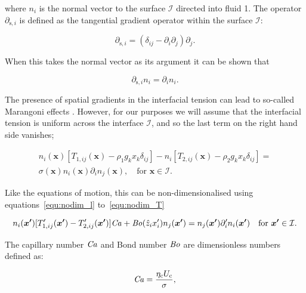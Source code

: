 \documentclass[12pt]{article}
\newcommand\Bo{\mbox{\textit{Bo}}}  %
\newcommand\Ca{\mbox{\textit{Ca}}} %
\begin{document}
where $n_{i}$ is the normal vector to the surface $\mathcal{I}$ directed into fluid 1. The operator $\partial_{\text{s},i}$ is defined as the tangential gradient operator within the surface $\mathcal{I}$:

\begin{equation}
\label{equ:surf_grad}
\partial_{\text{s},i} = (\delta_{ij} - \partial_{i} \partial_{j}) \partial_{j} .
\end{equation}

When this takes the normal vector as its argument it can be shown that \citep{Brackbill92}

\begin{equation}
\label{equ:tang_diff_norm}
\partial_{\text{s},i} n_{i} = \partial_{i} n_{i}.
\end{equation}

The presence of spatial gradients in the interfacial tension can lead to so-called Marangoni effects \citep{Thomson1855, Gibbs1878}. However, for our purposes we will assume that the interfacial tension is uniform across the interface $\mathcal{I}$, and so the last term on the right hand side vanishes;

\begin{align}
\label{equ:fluid_fluid_dyn_nograd}
n_{i}(\boldsymbol{x}) [{T}_{1,ij} (\boldsymbol{x}) - \rho_{1} g_{k} x_{k} \delta_{ij}] - n_{i} [T_{2,ij}(\boldsymbol{x}) - \rho_{2} g_{k} x_{k} \delta_{ij}] = \\ \nonumber
\sigma(\boldsymbol{x}) n_{i}(\boldsymbol{x}) \partial_{i} n_{j}(\boldsymbol{x}),  \quad \text{for }\boldsymbol{x} \in \mathcal{I}.
\end{align}

Like the equations of motion, this can be non-dimensionalised using equations~\ref{equ:nodim_l} to~\ref{equ:nodim_T}

\begin{equation}
\label{equ:nodim_fluid_fluid_dyn}
n_{i}(\boldsymbol{x'}) [T'_{1,ij}(\boldsymbol{x'}) - T'_{2,ij}(\boldsymbol{x'})] \Ca + \Bo (\hat{z}_{i} x'_{i}) n_{j}(\boldsymbol{x'}) = n_{j}(\boldsymbol{x'}) \partial'_{i} n_{i}(\boldsymbol{x'}) \quad \text{for }\boldsymbol{x'} \in \mathcal{I}.
\end{equation}

The capillary number $\Ca$ and  Bond number $\Bo$ are dimensionless numbers defined as:

\begin{equation}
\label{equ:cap}
\Ca = \frac{\eta_{\text{c}} U_{\text{c}}}{\sigma},
\end{equation}
\end{document}
